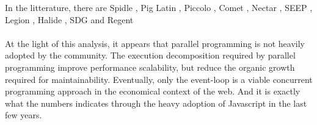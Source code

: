 In the litterature, there are
Spidle \cite{Consel2003},
Pig Latin \cite{Olston2008},
Piccolo \cite{Power2010},
Comet \cite{He2010},
Nectar \cite{Gunda2010},
SEEP \cite{Migliavacca2010},
Legion \cite{Bauer2012},
Halide \cite{Ragan-Kelley2013},
SDG \cite{Fernandez2014a} and
Regent \cite{Slaughter2015}


\paragraph{}

At the light of this analysis, it appears that parallel programming is not heavily adopted by the community.
The execution decomposition required by parallel programming improve performance scalability, but reduce the organic growth required for maintainability.
Eventually, only the event-loop is a viable concurrent programming approach in the economical context of the web.
And it is exactly what the numbers indicates through the heavy adoption of Javascript in the last few years.

